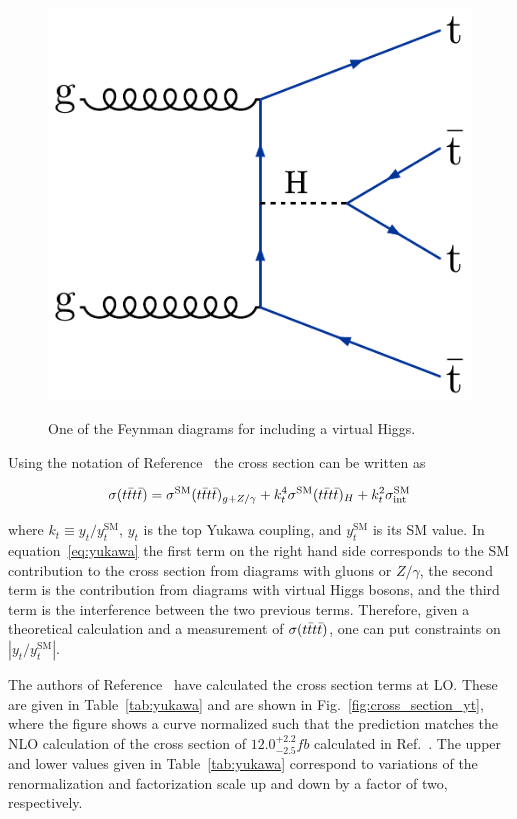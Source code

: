 \begin{figure}[!hbtp]
\centering
\includegraphics[width=.35\textwidth]{figs/ftp/ftdiag3.pdf} \\
\caption{One of the Feynman diagrams for \tttt including a virtual Higgs.}
\label{fig:feynYukawa}
\end{figure}

Using the notation of Reference~\cite{THEORY:TopYukawaTTTT} the \tttt cross section can be written 
as 

\begin{equation} 
\label{eq:yukawa}
\sigma(t\bar{t}t\bar{t}) = \sigma^{\text{SM}}(t\bar{t}t\bar{t})_{g+Z/\gamma} + k_t^4 \sigma^{\text{SM}}(t\bar{t}t\bar{t})_H + k_t^2 \sigma^{\text{SM}}_{\rm int}
\end{equation} 

\noindent where $k_t \equiv y_t/y_t^{\text{SM}}$, $y_t$ is the top Yukawa coupling, and $y_t^{\text{SM}}$ is its SM value.
In equation~\ref{eq:yukawa} the first term on the right hand side corresponds to the 
SM contribution to the cross section from diagrams with gluons or $Z/\gamma$, the second term
is the contribution from diagrams with virtual Higgs bosons, and the third term is the interference between
the two previous terms. Therefore, given a theoretical calculation and a measurement of $\sigma(t\bar{t}t\bar{t})$, one can put 
constraints on $|y_t/y_t^{\text{SM}}|$.

The authors of Reference~\cite{THEORY:TopYukawaTTTT} have calculated the cross section terms at LO.
These are given in Table~\ref{tab:yukawa} and are shown in Fig.~\ref{fig:cross_section_yt},
where the figure shows a curve normalized such that the prediction matches the NLO calculation of 
the \tttt cross section of $12.0^{+2.2}_{-2.5}\unit{fb}$ calculated in Ref.~\cite{THEORY:Frederix2017wme}.
The upper and lower values given in Table~\ref{tab:yukawa} correspond to variations
of the renormalization and factorization scale up and down by a factor of two, respectively.

